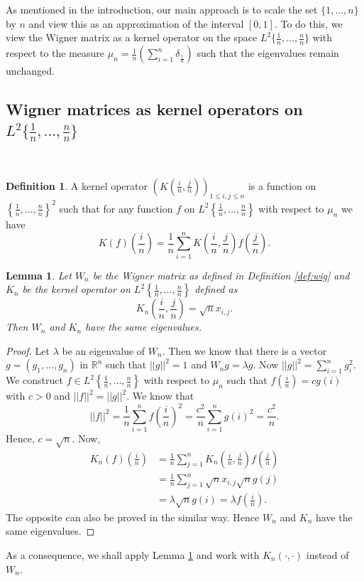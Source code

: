\documentclass[reqno,12pt]{amsart}
\theoremstyle{plain}
\newtheorem{lemma}{Lemma}
\theoremstyle{definition}
\newtheorem{definition}{Definition}
\begin{document}
As mentioned in the introduction, our main approach is to scale the set $\{ 1,\ldots ,n \}$ by $n$ and view this as an approximation of the interval $[0,1]$. To do this, we view the Wigner matrix as a kernel operator on the space $L^{2}\{ \frac{1}{n},\ldots, \frac{n}{n}  \}$ with respect to the measure $\mu_{n}= \frac{1}{n} \left( \sum_{i=1}^{n} \delta_{\frac{i}{n}} \right)$ such that the eigenvalues remain unchanged. 

\subsection{Wigner matrices as kernel operators on $L^{2}\{ \frac{1}{n},\ldots, \frac{n}{n}  \}$}\label{kernel}  \
\begin{definition}\label{def:kernel}
A kernel operator $\left(K\left(\frac{i}{n},\frac{j}{n}\right)\right)_{1\le i,j \le n}$ is a function on $\left\{  
\frac{1}{n},\ldots, \frac{n}{n} \right\}^2$ such that for any function $f$ on $L^{2}\left\{ \frac{1}{n},\ldots, \frac{n}{n}  \right\}$ with respect to $\mu_{n}$ we have
\[
K(f)\left(\frac{i}{n}\right)=  \frac{1}{n}\sum_{i=1}^{n} K\left(\frac{i}{n},\frac{j}{n}\right) f\left(\frac{j}{n}\right).
\]
\end{definition}
\begin{lemma}\label{lem:wigtokernel}
Let $W_{n}$ be the Wigner matrix as defined in Definition \ref{def:wig} and $K_{n}$ be the  kernel operator on $L^{2}\left\{ \frac{1}{n}, \ldots, \frac{n}{n} \right\}$ defined as  
\[
K_{n}\left( \frac{i}{n}, \frac{j}{n} \right)= \sqrt{n} x_{i,j}.
\]
Then $W_{n}$ and $K_{n}$ have the same eigenvalues.
\end{lemma}
\begin{proof}
Let $\lambda$ be an eigenvalue of $W_{n}$. Then we know that there is a vector $g=(g_{1},\ldots, g_{n})$ in $\mathbb{R}^{n}$ such that $||g||^2=1$ and $W_{n}g =\lambda g$. Now $|| g ||^2= \sum_{i=1}^{n}g_{i}^2$. We construct $f \in L^{2}\left\{ \frac{1}{n},\ldots, \frac{n}{n} \right\}$ with respect to $\mu_{n}$ such that $f(\frac{i}{n})=c g(i)$ with $c>0$ and $||f||^2=||g||^2$. We know that 
\[
||f||^{2}= \frac{1}{n}\sum_{i=1}^{n} f\left( \frac{i}{n} \right)^2= \frac{c^2}{n} \sum_{i=1}^{n} g(i)^2= \frac{c^2}{n}.
\]
Hence, $c= \sqrt{n}$. Now, 
\begin{equation}
\begin{split}
K_{n}(f)\left( \frac{i}{n} \right)& = \frac{1}{n} \sum_{j=1}^{n} K_{n}\left( \frac{i}{n}, \frac{j}{n} \right) f\left(\frac{j}{n}\right)\\
& = \frac{1}{n}\sum_{j=1}^{n} \sqrt{n} x_{i,j} \sqrt{n} g(j)\\
&= \lambda \sqrt{n} g(i)= \lambda f\left(\frac{i}{n}\right).
\end{split}
\end{equation}
The opposite can also be proved in the similar way. Hence $W_{n}$ and $K_{n}$ have the same eigenvalues.
\end{proof}
As a consequence, we shall apply Lemma \ref{lem:wigtokernel} and work with $K_{n}(\cdot,\cdot)$ instead of $W_{n}$.
\end{document}
